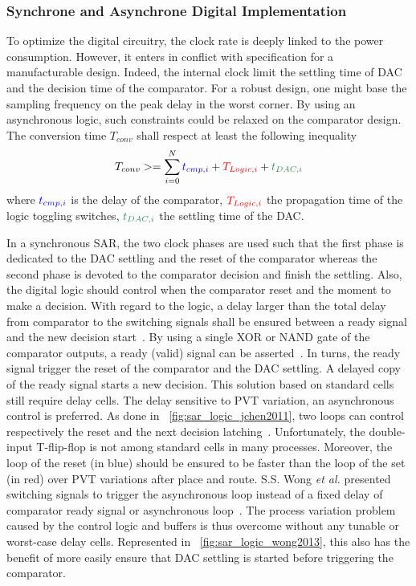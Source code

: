 \subsubsection{Synchrone and Asynchrone Digital Implementation}
To optimize the digital circuitry, the clock rate is deeply linked to the power consumption. However, it enters in conflict with specification for a manufacturable design. Indeed, the internal clock limit the settling time of DAC and the decision time of the comparator. For a robust design, one might base the sampling frequency on the peak delay in the worst corner. By using an asynchronous logic, such constraints could be relaxed on the comparator design. The conversion time \(T_{conv}  \) shall respect at least the following inequality
\begin{equation}
\label{eqn:sar_async_conv}
T_{conv} >= \sum_{i=0}^N {\textcolor{blue}{t_{cmp, i}}+\textcolor{red}{T_{Logic, i}}+\textcolor{Xgreen}{t_{DAC, i}}}
\end{equation}
where \(\textcolor{blue}{t_{cmp, i}}\) is the delay of the comparator, \(\textcolor{red}{T_{Logic, i}}\) the propagation time of the logic toggling switches, \(\textcolor{Xgreen}{t_{DAC, i}}\) the settling time of the DAC\@.

In a synchronous SAR, the two clock phases are used such that the first phase is dedicated to the DAC settling and the reset of the comparator whereas the second phase is devoted to the comparator decision and finish the settling. Also, the digital logic should control when the comparator reset and the moment to make a decision. With regard to the logic, a delay larger than the total delay from comparator to the switching signals shall be ensured between a ready signal and the new decision start~\cite{Brenna2014}. By using a single XOR or NAND gate of the comparator outputs, a ready (valid) signal can be asserted~\cite{Brenna2014, Sekimoto2011, Zhu2015,Shen2018}. In turns, the ready signal trigger the reset of the comparator and the DAC settling. A delayed copy of the ready signal starts a new decision. This solution based on standard cells still require delay cells. The delay sensitive to PVT variation, an asynchronous control is preferred. As done in \figurename~\ref{fig:sar_logic_jchen2011}, two loops can control respectively the reset and the next decision latching~\cite{JChen2011}. Unfortunately, the double-input T-flip-flop is not among standard cells in many processes. Moreover, the loop of the reset (in blue) should be ensured to be faster than the loop of the set (in red) over PVT variations after place and route. S.S. Wong \textit{et al.} presented switching signals to trigger the asynchronous loop instead of a fixed delay of comparator ready signal or asynchronous loop~\cite{Wong2013}. The process variation problem caused by the control logic and buffers is thus overcome without any tunable or worst-case delay cells. Represented in \figurename~\ref{fig:sar_logic_wong2013}, this also has the benefit of more easily ensure that DAC settling is started before triggering the comparator.

